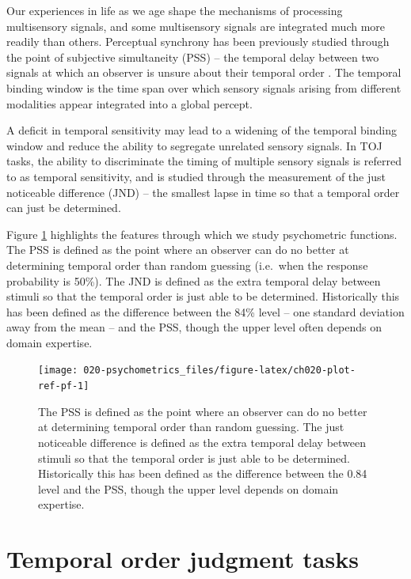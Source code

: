 \documentclass[11pt, oneside, openany]{scrbook}
\begin{document}
Our experiences in life as we age shape the mechanisms of processing multisensory signals, and some multisensory signals are integrated much more readily than others. Perceptual synchrony has been previously studied through the point of subjective simultaneity (PSS) -- the temporal delay between two signals at which an observer is unsure about their temporal order \citep{stone2001now}. The temporal binding window is the time span over which sensory signals arising from different modalities appear integrated into a global percept.

A deficit in temporal sensitivity may lead to a widening of the temporal binding window and reduce the ability to segregate unrelated sensory signals. In TOJ tasks, the ability to discriminate the timing of multiple sensory signals is referred to as temporal sensitivity, and is studied through the measurement of the just noticeable difference (JND) -- the smallest lapse in time so that a temporal order can just be determined.

Figure \ref{fig:ch020-plot-ref-pf} highlights the features through which we study psychometric functions. The PSS is defined as the point where an observer can do no better at determining temporal order than random guessing (i.e.~when the response probability is 50\%). The JND is defined as the extra temporal delay between stimuli so that the temporal order is just able to be determined. Historically this has been defined as the difference between the 84\% level -- one standard deviation away from the mean -- and the PSS, though the upper level often depends on domain expertise.

\begin{figure}

{\centering \texttt{[image: 020-psychometrics\_files/figure-latex/ch020-plot-ref-pf-1]} 

}

\caption{The PSS is defined as the point where an observer can do no better at determining temporal order than random guessing. The just noticeable difference is defined as the extra temporal delay between stimuli so that the temporal order is just able to be determined. Historically this has been defined as the difference between the 0.84 level and the PSS, though the upper level depends on domain expertise.}\label{fig:ch020-plot-ref-pf}
\end{figure}

\hypertarget{toj-task}{%
\section{Temporal order judgment tasks}\label{toj-task}}
\end{document}
